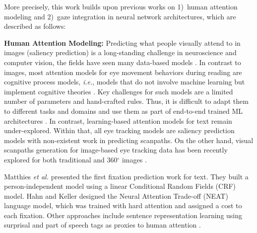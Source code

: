 More precisely, this work builds upon previous works on 1)~human attention modeling and 2)~gaze integration in neural network architectures, which are described as follows:

\textbf{Human Attention Modeling:} Predicting what people visually attend to in images (saliency prediction) is a long-standing challenge
in neuroscience and computer vision, the fields have seen many data-based models \cite{wang2021salient}. In contrast to images, most attention models for eye movement behaviors during reading are cognitive process models, \textit{i.e.}, models that do not involve machine learning but implement cognitive theories \cite{engbert2005swift,xia-etal-2019-automatic}. Key challenges for such models are a limited number of parameters and hand-crafted rules. Thus, it is difficult to adapt them to different tasks and domains and use them as part of end-to-end trained ML architectures \cite{kotseruba202040}. In contrast, learning-based attention models for text remain under-explored. Within that, all eye tracking models are saliency prediction models with non-existent work in predicting scanpaths. On the other hand, visual scanpaths generation for image-based eye tracking data has been recently explored for both traditional \cite{PathGANScanPathGen} and 360$^{\circ}$ images \cite{ScanGAN360}.

Matthies \textit{et al.} \cite{matthies-sogaard-2013-blinkers} presented the first fixation prediction work for text. They built a person-independent model using a linear Conditional Random Fields (CRF) model. %
Hahn and Keller \cite{hahn-keller-2016-modeling} designed the Neural Attention Trade-off (NEAT) language model, which was trained with hard attention and assigned a cost to each fixation. Other approaches include sentence representation learning using surprisal and part of speech tags as proxies to human attention \cite{10.5555/3171837.3171864}.%

